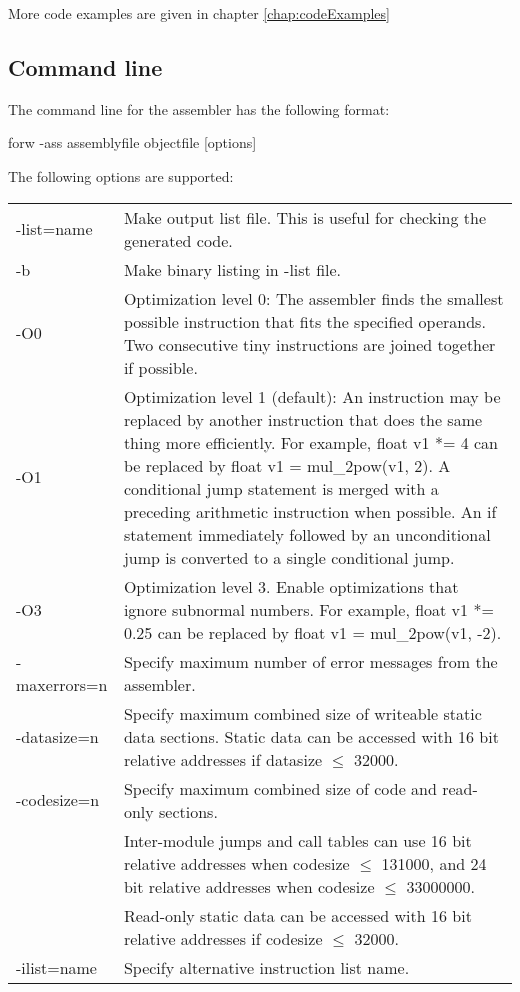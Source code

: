 \documentclass[forwardcom.tex]{subfiles}
\begin{document}
More code examples are given in chapter \ref{chap:codeExamples}
\vspace{2mm}

\subsection{Command line} \label{assemblerCommandLine}
The command line for the assembler has the following format:

\vspace{2mm}
\hspace{5mm} {\ttfamily forw -ass assemblyfile objectfile [options]}

\vspace{2mm}
The following options are supported:\\
\begin{tabular}{|p{25mm}p{135mm}|}
\hline
-list=name & Make output list file. This is useful for checking the generated code.\\
-b         & Make binary listing in -list file. \\
-O0 & Optimization level 0: The assembler finds the smallest possible instruction that fits the specified operands. Two consecutive tiny instructions are joined together if possible. \\
-O1 & Optimization level 1 (default): An instruction may be replaced by another instruction that does the same thing more efficiently. For example, {\ttfamily float v1 *= 4} can be replaced by
 {\ttfamily float v1 = mul\_2pow(v1, 2)}. 
 A conditional jump statement is merged with a preceding arithmetic instruction when possible.
 An {\ttfamily if} statement immediately followed by an
 unconditional jump is converted to a single conditional jump.\\
-O3 & Optimization level 3. Enable optimizations that ignore subnormal numbers. For example, {\ttfamily float v1 *= 0.25} can be replaced by {\ttfamily float v1 = mul\_2pow(v1, -2)}.\\
-maxerrors=n & Specify maximum number of error messages from the assembler.\\
-datasize=n & Specify maximum combined size of writeable static data sections. Static data can be accessed with 16 bit relative addresses if datasize $\leq$ 32000. \\
-codesize=n & Specify maximum combined size of code and read-only sections. \\
           & Inter-module jumps and call tables can use 16 bit relative addresses when codesize $\leq$ 131000, and 24 bit relative addresses when codesize $\leq$ 33000000. \\
           & Read-only static data can be accessed with 16 bit relative addresses if codesize $\leq$ 32000. \\
-ilist=name & Specify alternative instruction list name.\\
\hline
\end{tabular}
\vspace{2mm}
\end{document}
